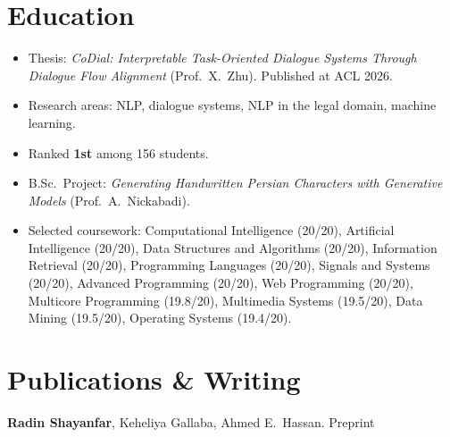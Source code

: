 \documentclass[11pt,letterpaper]{article}
\begin{document}
\section*{Education}

\begin{itemize}
  \item Thesis: \textit{CoDial: Interpretable Task-Oriented Dialogue Systems Through Dialogue Flow Alignment} (Prof.\ X.\ Zhu). Published at ACL 2026.
  \item Research areas: NLP, dialogue systems, NLP in the legal domain, machine learning.
\end{itemize}

\begin{itemize}
  \item Ranked \textbf{1st} among 156 students.
  \item B.Sc.\ Project: \textit{Generating Handwritten Persian Characters with Generative Models} (Prof.\ A.\ Nickabadi).
  \item Selected coursework: Computational Intelligence (20/20), Artificial Intelligence (20/20), Data Structures and Algorithms (20/20), Information Retrieval (20/20), Programming Languages (20/20), Signals and Systems (20/20), Advanced Programming (20/20), Web Programming (20/20), Multicore Programming (19.8/20), Multimedia Systems (19.5/20), Data Mining (19.5/20), Operating Systems (19.4/20).
\end{itemize}


\section*{Publications \& Writing}

  {\textbf{Radin Shayanfar}, Keheliya Gallaba, Ahmed E.\ Hassan.}
  {Preprint}
\end{document}
